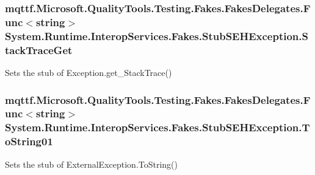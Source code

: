 \hypertarget{class_system_1_1_runtime_1_1_interop_services_1_1_fakes_1_1_stub_s_e_h_exception_aa3448239fe0d3debf7db2a74cc384600}{
\subsubsection[{Stack\-Trace\-Get}]{\setlength{\rightskip}{0pt plus 5cm}mqttf.\-Microsoft.\-Quality\-Tools.\-Testing.\-Fakes.\-Fakes\-Delegates.\-Func$<$string$>$ System.\-Runtime.\-Interop\-Services.\-Fakes.\-Stub\-S\-E\-H\-Exception.\-Stack\-Trace\-Get}}\label{class_system_1_1_runtime_1_1_interop_services_1_1_fakes_1_1_stub_s_e_h_exception_aa3448239fe0d3debf7db2a74cc384600}


Sets the stub of Exception.\-get\-\_\-\-Stack\-Trace()

\hypertarget{class_system_1_1_runtime_1_1_interop_services_1_1_fakes_1_1_stub_s_e_h_exception_a4c54c6af2f8b7e3204ff86ceb3a9823f}{
\subsubsection[{To\-String01}]{\setlength{\rightskip}{0pt plus 5cm}mqttf.\-Microsoft.\-Quality\-Tools.\-Testing.\-Fakes.\-Fakes\-Delegates.\-Func$<$string$>$ System.\-Runtime.\-Interop\-Services.\-Fakes.\-Stub\-S\-E\-H\-Exception.\-To\-String01}}\label{class_system_1_1_runtime_1_1_interop_services_1_1_fakes_1_1_stub_s_e_h_exception_a4c54c6af2f8b7e3204ff86ceb3a9823f}


Sets the stub of External\-Exception.\-To\-String()



